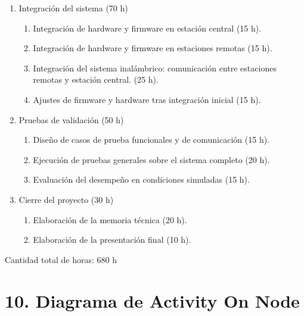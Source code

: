 \documentclass[
11pt, %
]{charter}
\begin{document}
\begin{enumerate}
	\item Integración del sistema (70 h)
	\begin{enumerate}
		\item Integración de hardware y firmware en estación central (15 h).
		\item Integración de hardware y firmware en estaciones remotas (15 h).
		\item Integración del sistema inalámbrico: comunicación entre estaciones remotas y estación central. (25 h).
		\item Ajustes de firmware y hardware tras integración inicial (15 h).
	\end{enumerate}
	
	\item Pruebas de validación (50 h)
	\begin{enumerate}
		\item Diseño de casos de prueba funcionales y de comunicación (15 h).
		\item Ejecución de pruebas generales sobre el sistema completo (20 h).
		\item Evaluación del desempeño en condiciones simuladas (15 h).
	\end{enumerate}
	
	\item Cierre del proyecto (30 h)
	\begin{enumerate}
		\item Elaboración de la memoria técnica (20 h).
		\item Elaboración de la presentación final (10 h).
	\end{enumerate}
\end{enumerate}

Cantidad total de horas: 680 h

\section{10. Diagrama de Activity On Node}
\label{sec:AoN}
\end{document}

